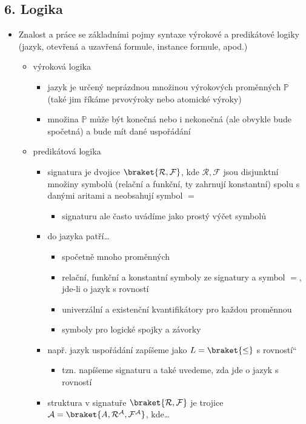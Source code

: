 \subsection{6. Logika}
\begin{itemize}
\item Znalost a práce se základními pojmy syntaxe výrokové a predikátové logiky (jazyk, otevřená a uzavřená formule, instance formule, apod.)
\begin{itemize}
\item výroková logika
\begin{itemize}
\item jazyk je určený neprázdnou množinou výrokových proměnných $\mathbb P$ (také jim říkáme prvovýroky nebo atomické výroky)
\item množina $\mathbb P$ může být konečná nebo i nekonečná (ale obvykle bude spočetná) a bude mít dané uspořádání
\end{itemize}
\item predikátová logika
\begin{itemize}
\item signatura je dvojice $\braket{\mathcal {R,F}}$, kde $\mathcal{R,F}$ jsou disjunktní množiny symbolů (relační a funkční, ty zahrnují konstantní) spolu s danými aritami a neobsahují symbol $=$
\begin{itemize}
\item signaturu ale často uvádíme jako prostý výčet symbolů
\end{itemize}
\item do jazyka patří\dots{}
\begin{itemize}
\item spočetně mnoho proměnných
\item relační, funkční a konstantní symboly ze signatury a symbol $=$, jde-li o jazyk s rovností
\item univerzální a existenční kvantifikátory pro každou proměnnou
\item symboly pro logické spojky a závorky
\end{itemize}
\item např. jazyk uspořádání zapíšeme jako \quotedblbase{}$L=\braket{\leq}$ s rovností\textquotedblleft{}
\begin{itemize}
\item tzn. napíšeme signaturu a také uvedeme, zda jde o jazyk s rovností
\end{itemize}
\item struktura v signatuře $\braket{\mathcal{R,F}}$ je trojice $\mathcal A=\braket{A,\mathcal{R^A,F^A}}$, kde\dots{}

\end{itemize}
\end{itemize}
\end{itemize}
